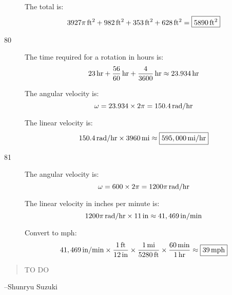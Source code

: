 \documentclass{exam}
\begin{document}
\begin{description}
        The total is:
        \[
          \unit[3927 \pi]{ft^2} + \unit[982]{ft^2} + \unit[353]{ft^2} + \unit[628]{ft^2} = \boxed{ \unit[5890]{ft^2} }
        \]
        
      \item[80]
        The time required for a rotation in hours is: 
        \[
          \unit[23]{hr} + \unit[ \frac{56}{60} ]{hr} + \unit[\frac{4}{3600}]{hr} \approx \unit[23.934]{hr}
        \]

        The angular velocity is:
        \[
          \omega = 23.934 \times 2 \pi = \unit[150.4]{rad/hr}
        \]

        The linear velocity is:
        \[
          \unit[150.4]{rad/hr} \times \unit[3960]{mi} \approx \boxed{ \unit[ 595,000 ]{mi/hr} }
        \]

      \item[81]
        The angular velocity is:
        \[
          \omega = 600 \times 2 \pi = \unit[1200 \pi]{rad/hr}
        \]

        The linear velocity in inches per minute is:
        \[
          \unit[1200 \pi]{rad/hr} \times \unit[11]{in} \approx \unit[41,469]{in/min}
        \]

        Convert to mph:
        \[
          \unit[41,469]{in/min} \times \frac{\unit[1]{ft}}{\unit[12]{in}} \times \frac{\unit[1]{mi}}{\unit[5280]{ft}} \times \frac{\unit[60]{min}}{\unit[1]{hr}} 
          \approx \boxed{ \unit[39]{mph} }
        \]


    \end{description}

  \else
    \vspace{1 cm}
    \begin{quote}
      \begin{em}
        TO DO
      \end{em}
    \end{quote}
    \hspace{1 cm} --Shunryu Suzuki
  \fi
\end{document}
